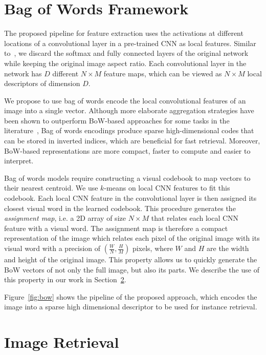 \documentclass{sig-arxiv}
\begin{document}
\section{Bag of Words Framework}\label{3_bow}%

The proposed pipeline for feature extraction uses the activations at different locations of a convolutional layer in a pre-trained CNN as local features. Similar to~\cite{tolias2015,kalantidis2015}, we discard the softmax and fully connected layers of the original network while keeping the original image aspect ratio. Each convolutional layer in the network has $D$ different $N \times M$ feature maps, which can be viewed as $N \times M$ local descriptors of dimension $D$.

We propose to use bag of words encode the local convolutional features of an image into a single vector. Although more elaborate aggregation strategies have been shown to outperform BoW-based approaches for some tasks in the literature~\cite{vlad,fishervectors}, Bag of words encodings produce sparse high-dimensional codes that can be stored in inverted indices, which are beneficial for fast retrieval. Moreover, BoW-based representations are more compact, faster to compute and easier to interpret.

Bag of words models require constructing a visual codebook to map vectors to their nearest centroid. We use $k$-means on local CNN features to fit this codebook. Each local CNN feature in the convolutional layer is then assigned its closest visual word in the learned codebook. This procedure generates the \textit{assignment map}, i.e. a 2D array of size $N \times M$ that relates each local CNN feature with a visual word. The assignment map is therefore a compact representation of the image which relates each pixel of the original image with its visual word with a precision of $ \left(\frac{W}{N}, \frac{H}{M}\right)$ pixels, where $W$ and $H$ are the width and height of the original image. This property allows us to quickly generate the BoW vectors of not only the full image, but also its parts. We describe the use of this property in our work in Section~\ref{5_retrieval}.

Figure~\ref{fig:bow} shows the pipeline of the proposed approach, which encodes the image into a sparse high dimensional descriptor to be used for instance retrieval.


\section{Image Retrieval}\label{5_retrieval}
\end{document}
